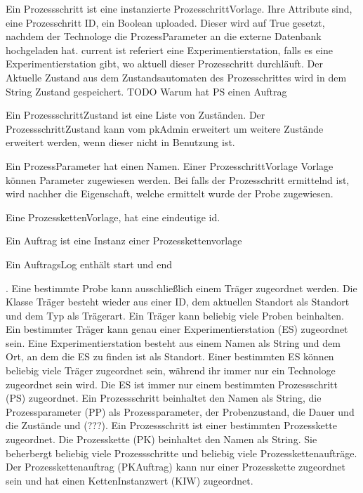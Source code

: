\documentclass[enabledeprecatedfontcommands,fontsize=12pt,paper=a4,twoside]{scrartcl}
\begin{document}
{Ein Prozessschritt ist eine instanzierte ProzesschrittVorlage. Ihre Attribute
sind, eine Prozesschritt ID, ein Boolean uploaded. Dieser wird auf True gesetzt,
nachdem der Technologe die ProzessParameter an die externe Datenbank hochgeladen
hat. current ist referiert eine Experimentierstation, falls es eine
Experimentierstation gibt, wo aktuell dieser Prozesschritt durchläuft. Der
Aktuelle Zustand aus dem Zustandsautomaten des Prozesschrittes wird in dem
String Zustand gespeichert. TODO Warum hat PS einen Auftrag

Ein ProzessschrittZustand ist eine Liste von Zuständen. Der
ProzessschrittZustand kann vom pkAdmin erweitert um weitere Zustände erweitert
werden, wenn dieser nicht in Benutzung ist.

Ein ProzessParameter hat einen Namen. Einer ProzesschrittVorlage Vorlage können
Parameter zugewiesen werden. Bei falls der Prozesschritt ermittelnd ist, wird
nachher die Eigenschaft, welche ermittelt wurde der Probe zugewiesen.


Eine ProzesskettenVorlage, hat eine eindeutige id.

Ein Auftrag ist eine Instanz einer Prozesskettenvorlage

Ein AuftragsLog enthält start und end

  . Eine bestimmte Probe kann ausschließlich einem Träger zugeordnet werden.
Die Klasse Träger besteht wieder aus einer ID, dem aktuellen Standort als  Standort und dem Typ als Trägerart. Ein Träger kann beliebig viele Proben beinhalten. Ein bestimmter Träger kann genau einer Experimentierstation (ES) zugeordnet sein. Eine Experimentierstation besteht aus einem Namen als String und dem Ort, an dem die ES zu finden ist als Standort. Einer bestimmten ES können beliebig viele Träger zugeordnet sein, während ihr immer nur ein  Technologe zugeordnet sein wird. Die ES ist immer nur einem bestimmten Prozessschritt (PS) zugeordnet. Ein Prozessschritt beinhaltet den Namen als String, die Prozessparameter (PP) als Prozessparameter, der Probenzustand, die Dauer und die Zustände und (???). Ein Prozessschritt ist einer bestimmten Prozesskette zugeordnet. Die Prozesskette (PK) beinhaltet den Namen als String. Sie beherbergt beliebig viele Prozessschritte und beliebig viele Prozesskettenaufträge. Der  Prozesskettenauftrag (PKAuftrag) kann nur einer Prozesskette zugeordnet sein und hat einen KettenInstanzwert (KIW) zugeordnet. \\}
\end{document}
